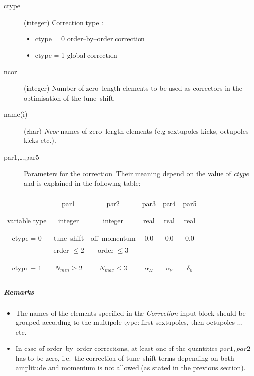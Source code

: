 \documentclass[a4paper,11pt]{report}
\begin{document}
\begin{description}
\item [ctype] (integer) Correction type :
\begin{itemize}
\item ctype = 0 order--by--order correction
\item ctype = 1 global correction
\end{itemize}
\item [ncor] (integer) Number of zero--length elements to be used as
  correctors in the optimisation of the tune--shift.
\item [name(i)] (char) {\em Ncor} \/names of zero--length elements
  (e.g sextupoles kicks, octupoles kicks etc.).
\item [par1,\ldots,par5] Parameters for the correction. Their meaning
  depend on the value of {\em ctype} \/and is explained in the
  following table:
\end{description}
\begin{table}[htb]
\begin{center}
\begin{tabular}{||c|c|c|c|c|c||}
  \hline
  & & & & & \\
  & par1 & par2 & par3 & par4 & par5 \\
  & & & & & \\
  \hline
  & & & & & \\
  variable type & integer & integer & real & real & real \\
  & & & & & \\
  \hline
  & & & & & \\
  ctype = 0 & tune--shift & off--momentum & 0.0 & 0.0 & 0.0 \\
  & order $\leq 2 $& order $\leq 3 $& & & \\
  & & & & & \\
  \hline
  & & & & & \\
  ctype = 1 & $N_{min}\geq 2$ & $N_{max}\leq 3$ & $\alpha_H$ &
  $\alpha_V$ &
  $\delta_0 $ \\
  & & & & & \\
  \hline
\end{tabular}
\end{center}
\end{table}
\subparagraph{Remarks}
\begin{itemize}
\item The names of the elements specified in the {\em Correction }
  \/input block should be grouped according to the multipole type:
  first sextupoles, then octupoles $\ldots$ etc.\ 
\item In case of order--by--order corrections, at least one of the
  quantities $par1,par2$ has to be zero, i.e.\ the correction of
  tune--shift terms depending on both amplitude and momentum is not
  allowed (as stated in the previous section).
\end{itemize}
\end{document}

